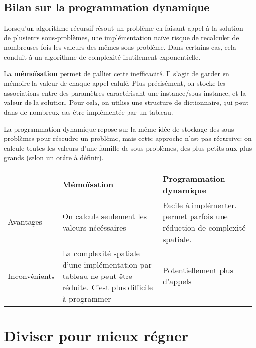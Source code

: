 \documentclass{scrartcl}
\begin{document}
		\subsection{Bilan sur la programmation dynamique}
			Lorsqu'un algorithme récursif résout un problème en faisant appel à la solution de plusieurs sous-problèmes,
			une implémentation naïve risque de recalculer de nombreuses fois les valeurs des mêmes sous-problème.
			Dans certains cas, cela conduit à un algorithme de complexité inutilement exponentielle.

			La \textbf{mémoïsation} permet de pallier cette inefficacité.
			Il s'agit de garder en mémoire la valeur de chaque appel calulé. 
			Plus précisément, on stocke les associations entre des paramètres caractérisant une instance/sous-instance, et la valeur de la solution.
			Pour cela, on utilise une structure de dictionnaire, qui peut dans de nombreux cas être implémentée par un tableau.

			La programmation dynamique repose sur la même idée de stockage des sous-problèmes pour résoudre un problème, 
			mais cette approche n'est pas récursive: on calcule toutes les valeurs d'une famille de sous-problèmes, des plus petits aux plus grands 
			(selon un ordre à définir).

			\begin{center}\begin{tabularx}{\textwidth}{| X | X | X |}
			\hline
			& Mémoïsation & Programmation dynamique \\
			\hline
			Avantages & On calcule seulement les valeurs nécéssaires & Facile à implémenter, permet parfois une réduction de complexité spatiale.\\
			\hline
			Inconvénients & La complexité spatiale d'une implémentation par tableau ne peut être réduite.
			C'est plus difficile à programmer & Potentiellement plus d'appels\\
			\hline
			\end{tabularx}\end{center}
	
	\section{Diviser pour mieux régner}
\end{document}

